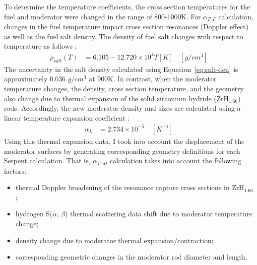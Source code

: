 To determine the temperature coefficients, the cross section temperatures for 
the fuel and moderator were changed in the range of 800-1000K. For 
$\alpha_{T,F}$ calculation, changes in the fuel temperature impact cross 
section resonances (Doppler effect) as well as the fuel salt density. The 
density of fuel salt changes with respect to temperature as follows 
\cite{janz_molten_1974}:
\begin{align}\label{eq:salt-den}
\rho_{salt}(T) &= 6.105 - 12.720\times10^4 T[K] \quad [g/cm^3]
\end{align}
The uncertainty in the salt density calculated using 
Equation~\ref{eq:salt-den} is approximately 0.036 $g/cm^3$ at 900K.
In contrast, when the moderator temperature changes, the density, cross 
section temperature, and the geometry also change due to thermal 
expansion of the solid zirconium hydride (ZrH$_{1.66}$) rods. Accordingly, the 
new moderator density and sizes are calculated using a linear temperature 
expansion coefficient \cite{yamanaka_thermal_1999}:
\begin{align}
\alpha_L &= 2.734\times10^{-5} \quad [K^{-1}]
\end{align}
Using this thermal expansion data, I took into account the displacement of the 
moderator surfaces by generating corresponding geometry definitions for each 
Serpent calculation. That is, $\alpha_{T,M}$ calculation takes into account 
the following factors:
\begin{itemize}[noitemsep, topsep=0pt]
	\item thermal Doppler broadening of the resonance capture cross sections 
	in ZrH$_{1.66}$;
	\item hydrogen S($\alpha$, $\beta$) thermal scattering data shift due to 
	moderator temperature change;
	\item density change due to moderator thermal expansion/contraction;
	\item corresponding geometric changes in the moderator rod diameter and 
	length.
\end{itemize}
 
